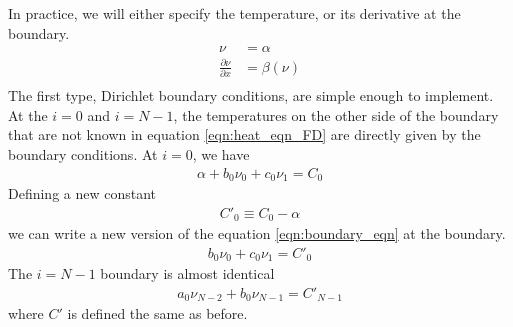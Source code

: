 \documentclass[letterpaper,12pt]{article}
\newcommand{\func}[1]{\left(#1\right)}
\begin{document}
In practice, we will either specify the temperature, or its  derivative at the boundary.
\begin{align}
  \nu &= \alpha \\
  \frac{\partial \nu}{\partial x} &= \beta\func{\nu}\\
\end{align}
The first type, Dirichlet boundary conditions, are simple enough to implement.
At the $i=0$ and $i=N-1$, the temperatures on the other side of the boundary
that are not known in equation \ref{eqn:heat_eqn_FD} are directly given by the
boundary conditions. At $i=0$, we have
\begin{align}
  \alpha
 +b_0 \nu_{0}
 +c_0 \nu_{1}
= C_0
\end{align}
Defining a new constant
\begin{align}
  C'_0 \equiv  C_0 - \alpha
\end{align}
we can write a new version of the equation \ref{eqn:boundary_eqn} at the boundary.
\begin{align}
  b_0 \nu_{0}
 +c_0 \nu_{1}
= C'_0
\end{align}
The $i=N-1$ boundary is almost identical
\begin{align}
  a_0 \nu_{N-2}
 +b_0 \nu_{N-1}
 = C'_{N-1}
\end{align}
where $C'$ is defined the same as before.
\end{document}
